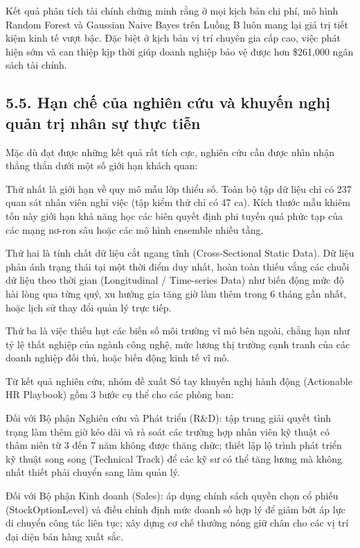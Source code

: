 \documentclass[12pt,a4paper]{article}
\begin{document}
Kết quả phân tích tài chính chứng minh rằng ở mọi kịch bản chi phí, mô hình Random Forest và Gaussian Naive Bayes trên Luồng B luôn mang lại giá trị tiết kiệm kinh tế vượt bậc. Đặc biệt ở kịch bản vị trí chuyên gia cấp cao, việc phát hiện sớm và can thiệp kịp thời giúp doanh nghiệp bảo vệ được hơn \$261,000 ngân sách tài chính.

\subsection{5.5. Hạn chế của nghiên cứu và khuyến nghị quản trị nhân sự thực tiễn}
Mặc dù đạt được những kết quả rất tích cực, nghiên cứu cần được nhìn nhận thẳng thắn dưới một số giới hạn khách quan:

Thứ nhất là giới hạn về quy mô mẫu lớp thiểu số. Toàn bộ tập dữ liệu chỉ có 237 quan sát nhân viên nghỉ việc (tập kiểm thử chỉ có 47 ca). Kích thước mẫu khiêm tốn này giới hạn khả năng học các biên quyết định phi tuyến quá phức tạp của các mạng nơ-ron sâu hoặc các mô hình ensemble nhiều tầng.

Thứ hai là tính chất dữ liệu cắt ngang tĩnh (Cross-Sectional Static Data). Dữ liệu phản ánh trạng thái tại một thời điểm duy nhất, hoàn toàn thiếu vắng các chuỗi dữ liệu theo thời gian (Longitudinal / Time-series Data) như biến động mức độ hài lòng qua từng quý, xu hướng gia tăng giờ làm thêm trong 6 tháng gần nhất, hoặc lịch sử thay đổi quản lý trực tiếp.

Thứ ba là việc thiếu hụt các biến số môi trường vĩ mô bên ngoài, chẳng hạn như tỷ lệ thất nghiệp của ngành công nghệ, mức lương thị trường cạnh tranh của các doanh nghiệp đối thủ, hoặc biến động kinh tế vĩ mô.

Từ kết quả nghiên cứu, nhóm đề xuất Sổ tay khuyến nghị hành động (Actionable HR Playbook) gồm 3 bước cụ thể cho các phòng ban:

Đối với Bộ phận Nghiên cứu và Phát triển (R\&D): tập trung giải quyết tình trạng làm thêm giờ kéo dài và rà soát các trường hợp nhân viên kỹ thuật có thâm niên từ 3 đến 7 năm không được thăng chức; thiết lập lộ trình phát triển kỹ thuật song song (Technical Track) để các kỹ sư có thể tăng lương mà không nhất thiết phải chuyển sang làm quản lý.

Đối với Bộ phận Kinh doanh (Sales): áp dụng chính sách quyền chọn cổ phiếu (StockOptionLevel) và điều chỉnh định mức doanh số hợp lý để giảm bớt áp lực di chuyển công tác liên tục; xây dựng cơ chế thưởng nóng giữ chân cho các vị trí đại diện bán hàng xuất sắc.
\end{document}
